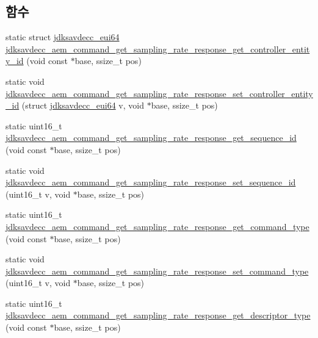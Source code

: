\subsection*{함수}
\begin{DoxyCompactItemize}
\item 
static struct \hyperlink{structjdksavdecc__eui64}{jdksavdecc\+\_\+eui64} \hyperlink{group__command__get__sampling__rate__response_ga60529101ca6ef4eee677ffe7996c717b}{jdksavdecc\+\_\+aem\+\_\+command\+\_\+get\+\_\+sampling\+\_\+rate\+\_\+response\+\_\+get\+\_\+controller\+\_\+entity\+\_\+id} (void const $\ast$base, ssize\+\_\+t pos)
\item 
static void \hyperlink{group__command__get__sampling__rate__response_ga5f9127939aea942ad2b15bec094b6e97}{jdksavdecc\+\_\+aem\+\_\+command\+\_\+get\+\_\+sampling\+\_\+rate\+\_\+response\+\_\+set\+\_\+controller\+\_\+entity\+\_\+id} (struct \hyperlink{structjdksavdecc__eui64}{jdksavdecc\+\_\+eui64} v, void $\ast$base, ssize\+\_\+t pos)
\item 
static uint16\+\_\+t \hyperlink{group__command__get__sampling__rate__response_ga6a7be1cc010654153ede1750f98c9a83}{jdksavdecc\+\_\+aem\+\_\+command\+\_\+get\+\_\+sampling\+\_\+rate\+\_\+response\+\_\+get\+\_\+sequence\+\_\+id} (void const $\ast$base, ssize\+\_\+t pos)
\item 
static void \hyperlink{group__command__get__sampling__rate__response_gac20e1199e42c3955502e549c139f24ef}{jdksavdecc\+\_\+aem\+\_\+command\+\_\+get\+\_\+sampling\+\_\+rate\+\_\+response\+\_\+set\+\_\+sequence\+\_\+id} (uint16\+\_\+t v, void $\ast$base, ssize\+\_\+t pos)
\item 
static uint16\+\_\+t \hyperlink{group__command__get__sampling__rate__response_ga38baf13e3649a8755022dfb02af42a7b}{jdksavdecc\+\_\+aem\+\_\+command\+\_\+get\+\_\+sampling\+\_\+rate\+\_\+response\+\_\+get\+\_\+command\+\_\+type} (void const $\ast$base, ssize\+\_\+t pos)
\item 
static void \hyperlink{group__command__get__sampling__rate__response_gabc311c56464b0d15ec57e14421aef6f7}{jdksavdecc\+\_\+aem\+\_\+command\+\_\+get\+\_\+sampling\+\_\+rate\+\_\+response\+\_\+set\+\_\+command\+\_\+type} (uint16\+\_\+t v, void $\ast$base, ssize\+\_\+t pos)
\item 
static uint16\+\_\+t \hyperlink{group__command__get__sampling__rate__response_gafca42dc2dbc04f4fa5a67d0a77c8c659}{jdksavdecc\+\_\+aem\+\_\+command\+\_\+get\+\_\+sampling\+\_\+rate\+\_\+response\+\_\+get\+\_\+descriptor\+\_\+type} (void const $\ast$base, ssize\+\_\+t pos)
\item 

\end{DoxyCompactItemize}
